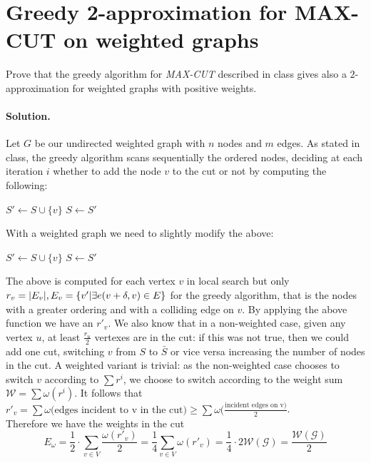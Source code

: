 \section{Greedy  2-approximation for  MAX-CUT  on  weighted  graphs}
Prove  that  the  greedy algorithm for \emph{MAX-CUT} described in class gives also a $2$-approximation for weighted graphs with positive weights.

\paragraph{Solution.}
Let $G$ be our undirected weighted graph with $n$ nodes and $m$ edges.
As stated in class, the greedy algorithm scans sequentially the ordered nodes, deciding at each iteration $i$ whether to add the node $v$ to the cut or not by computing the following:
	\begin{algorithmic}[1]
	\State $S' \gets S \cup \{v\}$\;
		\State $S \gets S'$\;
	\EndIf
	\EndFunction
	\end{algorithmic}
With a weighted graph we need to slightly modify the above:
	\begin{algorithmic}[1]
	\State $S' \gets S \cup \{v\}$\;
	\State $S \gets S'$\;
	\EndIf
	\EndFunction
\end{algorithmic}
The above is computed for each vertex $v$ in local search but only $r_v = \lvert E_v\rvert, E_v = \{v' | \exists e(v + \delta, v) \in E\}$ for the greedy algorithm, that is the nodes with a greater ordering and with a colliding edge on $v$.
By applying the above function we have an $r'_v$.
We also know that in a non-weighted case, given any vertex $u$, at least $\frac{r_u}{2}$ vertexes are in the cut: if this was not true, then we could add one cut, switching $v$ from $S$ to $\bar{S}$ or vice versa increasing the number of nodes in the cut.
A weighted variant is trivial: as the non-weighted case chooses to switch $v$ according to $\sum{r^i}$, we choose to switch according to the weight sum $\mathcal{W} = \sum{\omega(r^i)}$.
It follows that $r'_v = \sum{\omega(\text{edges incident to v in the cut}}) \geq \sum{\omega(\frac{\text{incident edges on v})}{2}}$. \\
Therefore we have the weights in the cut
\begin{equation}
E_{\omega} = \frac{1}{2} \cdot \sum_{v \in V}{\frac{\omega(r'_v)}{2}} =
\frac{1}{4} \sum_{v \in V}{\omega(r'_v)} =
\frac{1}{4} \cdot 2\mathcal{W(G)} = \frac{\mathcal{W(G)}}{2}
\end{equation}